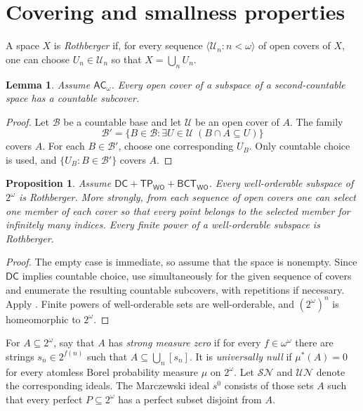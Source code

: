 \documentclass[11pt,reqno]{amsart}
\newcommand{\WO}{\mathsf{WO}}
\newcommand{\SN}{\mathcal{SN}}
\newcommand{\UN}{\mathcal{UN}}
\newcommand{\Mar}{s^0}
\newcommand{\BCTWO}{\mathsf{BCT}_{\WO}}
\newcommand{\TP}{\mathsf{TP}_{\WO}}
\theoremstyle{plain}
\newtheorem{proposition}[proposition]{Proposition}
\newtheorem{lemma}[lemma]{Lemma}
\theoremstyle{definition}
\theoremstyle{remark}
\begin{document}
\section{Covering and smallness properties}\label{sec:smallness}

A space $X$ is \emph{Rothberger} if, for every sequence
$\langle\mathcal U_n:n<\omega\rangle$ of open covers of $X$, one can choose
$U_n\in\mathcal U_n$ so that $X=\bigcup_nU_n$.

\begin{lemma}\label{lem:countable-subcover}
Assume $\mathsf{AC}_\omega$.  Every open cover of a subspace of a
second-countable space has a countable subcover.
\end{lemma}

\begin{proof}
Let $\mathcal B$ be a countable base and let $\mathcal U$ be an open cover of
$A$.  The family
\[
 \mathcal B'=\{B\in\mathcal B:\exists U\in\mathcal U\;(B\cap A\subseteq U)\}
\]
covers $A$.  For each $B\in\mathcal B'$, choose one corresponding $U_B$.
Only countable choice is used, and $\{U_B:B\in\mathcal B'\}$ covers $A$.
\end{proof}

\begin{proposition}\label{prop:rothberger}
Assume $\mathsf{DC}+\TP+\BCTWO$.  Every well-orderable subspace of
$2^\omega$ is Rothberger.  More strongly, from each sequence of open covers
one can select one member of each cover so that every point belongs to the
selected member for infinitely many indices.  Every finite power of a
well-orderable subspace is Rothberger.
\end{proposition}

\begin{proof}
The empty case is immediate, so assume that the space is nonempty.  Since
$\mathsf{DC}$ implies countable choice, use 
simultaneously for the given sequence of covers and enumerate the resulting
countable subcovers, with repetitions if necessary.  Apply
.  Finite powers of well-orderable sets are
well-orderable, and $(2^\omega)^n$ is homeomorphic to $2^\omega$.
\end{proof}

For $A\subseteq2^\omega$, say that $A$ has \emph{strong measure zero} if for
every $f\in\omega^\omega$ there are strings $s_n\in2^{f(n)}$ such that
$A\subseteq\bigcup_n[s_n]$.  It is \emph{universally null} if
$\mu^*(A)=0$ for every atomless Borel probability measure $\mu$ on
$2^\omega$.  Let $\SN$ and $\UN$ denote the corresponding ideals.  The
Marczewski ideal $\Mar$ consists of those sets $A$ such that every perfect
$P\subseteq2^\omega$ has a perfect subset disjoint from $A$.
\end{document}
